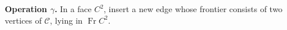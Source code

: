 \textbf{Operation $\gamma$.} In a face $C^2$, insert a new edge whose frontier consists of two vertices of $\mathcal{C}$, lying in $\operatorname{Fr} C^2$.
